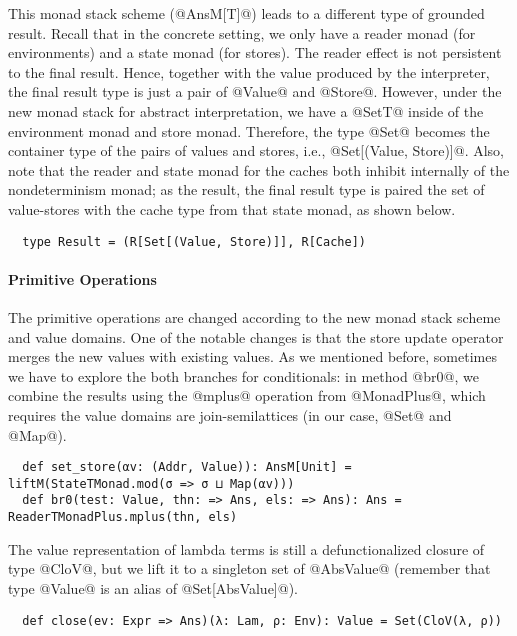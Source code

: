 This monad stack scheme (@AnsM[T]@) leads to a different type of grounded
result. Recall that in the concrete setting, we only have a reader monad (for
environments) and a state monad (for stores). The reader effect is not
persistent to the final result. Hence, together with the value produced by the
interpreter, the final result type is just a pair of @Value@ and @Store@.
However, under the new monad stack for abstract interpretation, we have a
@SetT@ inside of the environment monad and store monad. Therefore, the type
@Set@ becomes the container type of the pairs of values and stores, i.e.,
@Set[(Value, Store)]@.  Also, note that the reader and state monad for the
caches both inhibit internally of the nondeterminism monad; as the result, the
final result type is paired the set of value-stores with the cache type from
that state monad, as shown below.
\begin{lstlisting}
  type Result = (R[Set[(Value, Store)]], R[Cache])
\end{lstlisting}

\paragraph{Primitive Operations} The primitive operations are changed according
to the new monad stack scheme and value domains. One of the notable changes is
that the store update operator merges the new values with existing values.  As
we mentioned before, sometimes we have to explore the both branches for
conditionals: in method @br0@, we combine the results using the @mplus@
operation from @MonadPlus@, which requires the value domains are
join-semilattices (in our case, @Set@ and @Map@).
\begin{lstlisting}
  def set_store(αv: (Addr, Value)): AnsM[Unit] = liftM(StateTMonad.mod(σ => σ ⊔ Map(αv)))
  def br0(test: Value, thn: => Ans, els: => Ans): Ans = ReaderTMonadPlus.mplus(thn, els)
\end{lstlisting}

The value representation of lambda terms is still a defunctionalized closure of
type @CloV@, but we lift it to a singleton set of @AbsValue@ (remember that
type @Value@ is an alias of @Set[AbsValue]@).
\begin{lstlisting}
  def close(ev: Expr => Ans)(λ: Lam, ρ: Env): Value = Set(CloV(λ, ρ))
\end{lstlisting}

